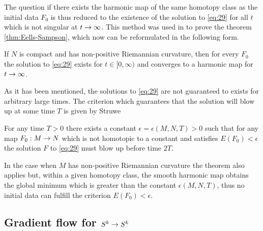 The question if there exists the harmonic map of the same homotopy
class as the initial data $F_0$ is thus reduced to the existence of
the solution to \eqref{eq:29} for all $t$ which is not singular at
$t\rightarrow\infty$. This method was used in \cite{Eells1964} to prove the
theorem \ref{thm:Eells-Sampson}, which now can be reformulated in the
following form.

\begin{theorem}\label{thm:Eells-Sampson2}
  If $N$ is compact and has non-positive Riemannian curvature, then
  for every $F_0$ the solution to \eqref{eq:29} exists for
  $t\in[0,\infty)$ and converges to a harmonic map for $t\rightarrow\infty$.
\end{theorem}

As it has been mentioned, the solutions to \eqref{eq:29} are not
guaranteed to exists for arbitrary large times. The criterion which
guarantees that the solution will blow up at some time $T$ is given by
Struwe

\begin{theorem}[Struwe]\label{thm:Struwe}
  For any time $T>0$ there exists a constant
  $\epsilon=\epsilon(M,N,T)>0$ such that for any map $F_0:M\rightarrow N$
  which is not homotopic to a constant and satisfies $E(F_0)<\epsilon$
  the solution $F$ to \eqref{eq:29} must blow up before time $2T$.
\end{theorem}

In the case when $M$ has non-positive Riemannian curvature the theorem
also applies but, within a given homotopy class, the smooth harmonic
map obtains the global minimum which is greater than the constant
$\epsilon(M,N,T)$, thus no initial data can fulfill the criterion
$E(F_0)<\epsilon$.

\subsection{Gradient flow for $S^k\rightarrow S^k$}
\label{sec:gradient-flow-skra}


